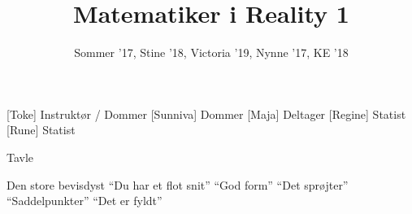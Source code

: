 \documentclass[a4paper,11pt]{article}
\title{Matematiker i Reality 1}
\author{Sommer '17, Stine '18, Victoria '19, Nynne '17, KE '18}
\begin{document}
\maketitle

\begin{roles}
[Toke] Instruktør / Dommer
[Sunniva] Dommer
[Maja] Deltager
[Regine] Statist
[Rune] Statist
\end{roles}

\begin{props}
 Tavle
\end{props}

\begin{sketch}

 Den store bevisdyst ``Du har et flot snit'' ``God form'' ``Det sprøjter'' ``Saddelpunkter'' ``Det er fyldt''
\end{sketch}
\end{document}
